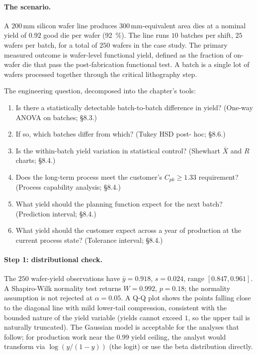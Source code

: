 \paragraph{The scenario.} A $200\,\si{\milli\meter}$ silicon wafer
line produces $300\,\si{\milli\meter}$-equivalent area dies at a
nominal yield of $0.92$ good die per wafer (92 \,\%). The line
runs $10$ batches per shift, $25$ wafers per batch, for a total
of $250$ wafers in the case study. The primary measured outcome
is wafer-level functional yield, defined as the fraction of
on-wafer die that pass the post-fabrication functional test. A
batch is a single lot of wafers processed together through the
critical lithography step.

The engineering question, decomposed into the chapter's tools:

\begin{enumerate}[leftmargin=*]
  \item Is there a statistically detectable batch-to-batch
    difference in yield? (One-way ANOVA on batches; §8.3.)
  \item If so, which batches differ from which? (Tukey HSD post-
    hoc; §8.6.)
  \item Is the within-batch yield variation in statistical
    control? (Shewhart $\bar{X}$ and $R$ charts; §8.4.)
  \item Does the long-term process meet the customer's
    $C_{pk} \geq 1.33$ requirement? (Process capability
    analysis; §8.4.)
  \item What yield should the planning function expect for the
    next batch? (Prediction interval; §8.4.)
  \item What yield should the customer expect across a year of
    production at the current process state? (Tolerance
    interval; §8.4.)
\end{enumerate}

\paragraph{Step 1: distributional check.} The $250$ wafer-yield
observations have $\bar{y} = 0.918$, $s = 0.024$, range
$[0.847, 0.961]$. A Shapiro-Wilk normality test returns
$W = 0.992$, $p = 0.18$; the normality assumption is not
rejected at $\alpha = 0.05$. A Q-Q plot shows the points falling
close to the diagonal line with mild lower-tail compression,
consistent with the bounded nature of the yield variable
(yields cannot exceed $1$, so the upper tail is naturally
truncated). The Gaussian model is acceptable for the analyses
that follow; for production work near the $0.99$ yield ceiling,
the analyst would transform via $\log(y/(1-y))$ (the logit) or
use the beta distribution directly.

